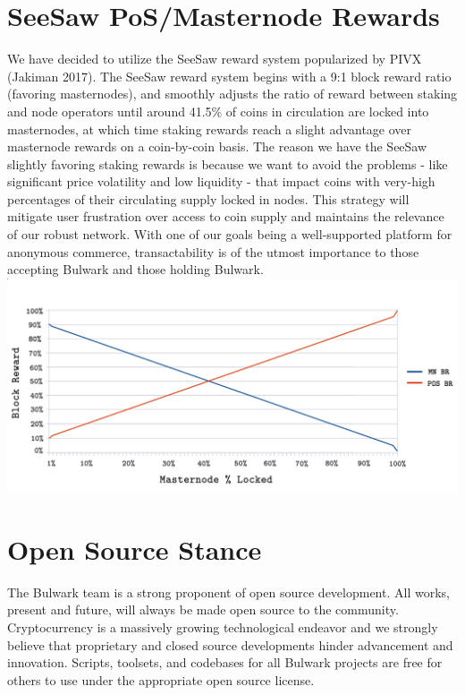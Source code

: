 \documentclass[11pt,a4paperpaper,]{report}
\begin{document}
\section{SeeSaw PoS/Masternode
Rewards}\label{seesaw-posmasternode-rewards}

We have decided to utilize the SeeSaw reward system popularized by PIVX
(Jakiman 2017). The SeeSaw reward system begins with a 9:1 block reward
ratio (favoring masternodes), and smoothly adjusts the ratio of reward
between staking and node operators until around 41.5\% of coins in
circulation are locked into masternodes, at which time staking rewards
reach a slight advantage over masternode rewards on a coin-by-coin
basis. The reason we have the SeeSaw slightly favoring staking rewards
is because we want to avoid the problems - like significant price
volatility and low liquidity - that impact coins with very-high
percentages of their circulating supply locked in nodes. This strategy
will mitigate user frustration over access to coin supply and maintains
the relevance of our robust network. With one of our goals being a
well-supported platform for anonymous commerce, transactability is of
the utmost importance to those accepting Bulwark and those holding
Bulwark.
\includegraphics[width=1.00000\textwidth]{source/figures/fig.png}

\newpage

\section{Open Source Stance}\label{open-source-stance}

The Bulwark team is a strong proponent of open source development. All
works, present and future, will always be made open source to the
community. Cryptocurrency is a massively growing technological endeavor
and we strongly believe that proprietary and closed source developments
hinder advancement and innovation. Scripts, toolsets, and codebases for
all Bulwark projects are free for others to use under the appropriate
open source license.
\end{document}
